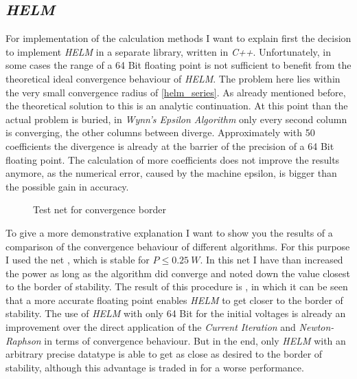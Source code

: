 \subsection{\emph{HELM}}
For implementation of the calculation methods I want to explain first the decision to implement \emph{HELM} in a separate library, written in \emph{C++}. Unfortunately, in some cases the range of a 64 Bit floating point is not sufficient to benefit from the theoretical ideal convergence behaviour of \emph{HELM}. The problem here lies within the very small convergence radius of \eqref{helm_series}. As already mentioned before, the theoretical solution to this is an analytic continuation. At this point than the actual problem is buried, in \emph{Wynn's Epsilon Algorithm} only every second column is converging, the other columns between diverge. Approximately with 50 coefficients the divergence is already at the barrier of the precision of a 64 Bit floating point. The calculation of more coefficients does not improve the results anymore, as the numerical error, caused by the machine epsilon, is bigger than the possible gain in accuracy.

\begin{figure}
	\centering
	
	\caption{Test net for convergence border}
	\label{fig:convergence_border_net}
\end{figure}

To give a more demonstrative explanation I want to show you the results of a comparison of the convergence behaviour of different algorithms. For this purpose I used the net , which is stable for $P \le \SI{0.25}{W}$. In this net I have than increased the power as long as the algorithm did converge and noted down the value closest to the border of stability. The result of this procedure is , in which it can be seen that a more accurate floating point enables \emph{HELM} to get closer to the border of stability. The use of \emph{HELM} with only 64 Bit for the initial voltages is already an improvement over the direct application of the \emph{Current Iteration} and \emph{Newton-Raphson} in terms of convergence behaviour. But in the end, only \emph{HELM} with an arbitrary precise datatype is able to get as close as desired to the border of stability, although this advantage is traded in for a worse performance.

